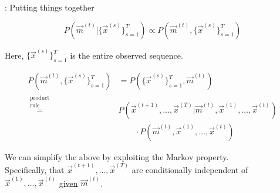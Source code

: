\begin{frame}{\subsecname: Putting things together}

\begin{equation}
P(
\vec m^{(t)} | \{\vec x^{(s)}\}_{s=1}^T )
\propto 
P(\vec m^{(t)} , \{\vec x^{(s)}\}_{s=1}^T)
\end{equation}

Here, $\{\vec x^{(s)}\}_{s=1}^T$ is the entire observed sequence.

\pause

\begin{align}
P(\vec m^{(t)} , \{\vec x^{(s)}\}_{s=1}^T)
&= 
P( \{\vec x^{(s)}\}_{s=1}^T, \vec m^{(t)})\\
\stackrel{\substack{\text{product}\\\text{rule}}}{=}&
P( \vec x^{(t+1)}, \ldots, \vec x^{(T)} | \vec m^{(t)}, \vec x^{(1)}, \ldots, \vec x^{(t)})\\
&\qquad\cdot 
P(\vec m^{(t)}, \vec x^{(1)}, \ldots, \vec x^{(t)}) 
\end{align}

\pause

We can simplify the above by exploiting the Markov property.\\
Specifically, that
$\vec x^{(t+1)}, \ldots, \vec x^{(T)}$ are conditionally independent of $\vec x^{(1)}, \ldots, \vec x^{(t)}$ \underline{given} $\vec m^{(t)}$.



\end{frame}

